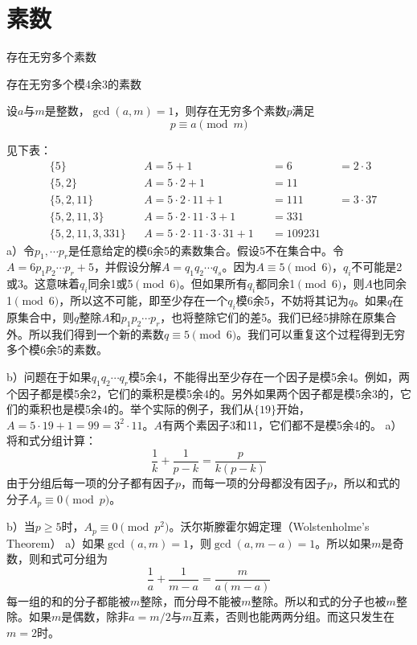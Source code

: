 \chapter{素数}
\begin{theorem}[无穷多素数定理]
存在无穷多个素数
\end{theorem}
\begin{theorem}[模4余3的素数定理]
存在无穷多个模4余3的素数
\end{theorem}
\begin{theorem}[算术级数的素数狄利克雷定理]
设$a$与$m$是整数，$\gcd(a,m)=1$，则存在无穷多个素数$p$满足
\[p\equiv a\pmod m\]
\end{theorem}
%
\exercise 见下表：
\begin{align*}
&\{5\} &&A=5+1 && =6 &&=2\cdot3 \\
&\{5,2\} &&A=5\cdot2+1 &&=11 && \\
&\{5,2,11\} &&A=5\cdot2\cdot11+1 && =111 &&=3\cdot37 \\
&\{5,2,11,3\} &&A=5\cdot2\cdot11\cdot3+1 && =331 && \\
&\{5,2,11,3,331\} &&A=5\cdot2\cdot11\cdot3\cdot31+1 && =109231 &&
\end{align*}
\exercise a）令$p_1,\cdots p_r$是任意给定的模6余5的素数集合。假设5不在集合中。令$A=6p_1p_2\cdots p_r+5$，并假设分解$A=q_1q_2\cdots q_s$。因为$A\equiv 5\pmod6$，$q_i$不可能是2或3。这意味着$q_i$同余1或5$\pmod6$。但如果所有$q_i$都同余1$\pmod6$，则$A$也同余1$\pmod6$，所以这不可能，即至少存在一个$q_i$模6余5，不妨将其记为$q$。如果$q$在原集合中，则$q$整除$A$和$p_1p_2\cdots p_r$，也将整除它们的差5。我们已经5排除在原集合外。所以我们得到一个新的素数$q\equiv5\pmod6$。我们可以重复这个过程得到无穷多个模6余5的素数。\par
b）问题在于如果$q_1q_2\cdots q_r$模5余4，不能得出至少存在一个因子是模5余4。例如，两个因子都是模5余2，它们的乘积是模5余4的。另外如果两个因子都是模5余3的，它们的乘积也是模5余4的。举个实际的例子，我们从$\{19\}$开始，$A=5\cdot19+1=99=3^2\cdot11$。$A$有两个素因子3和11，它们都不是模5余4的。
%
\exercise a）将和式分组计算：
\[\frac{1}{k}+\frac{1}{p-k}=\frac{p}{k(p-k)}\]
由于分组后每一项的分子都有因子$p$，而每一项的分母都没有因子$p$，所以和式的分子$A_p\equiv0\pmod p$。\par
b）当$p\ge5$时，$A_p\equiv0\pmod{p^2}$。沃尔斯滕霍尔姆定理（Wolstenholme's Theorem）
%
\exercise a）如果$\gcd(a, m) = 1$，则$\gcd(a, m-a)=1$。所以如果$m$是奇数，则和式可分组为
\[\frac{1}{a}+\frac{1}{m-a}=\frac{m}{a(m-a)}\]
每一组的和的分子都能被$m$整除，而分母不能被$m$整除。所以和式的分子也被$m$整除。如果$m$是偶数，除非$a=m/2$与$m$互素，否则也能两两分组。而这只发生在$m=2$时。\par
